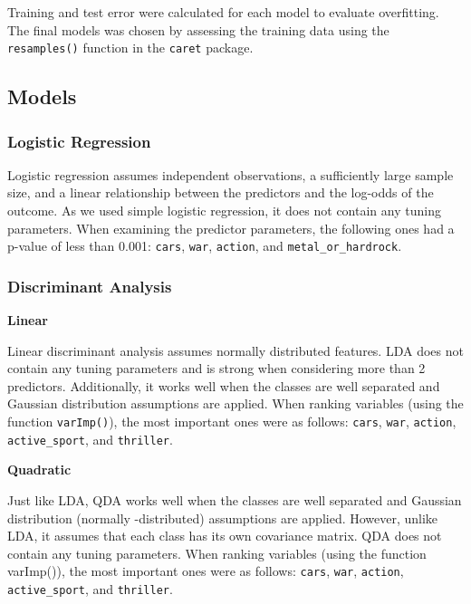 \documentclass[]{article}
\begin{document}
Training and test error were calculated for each model to evaluate
overfitting. The final models was chosen by assessing the training data
using the \texttt{resamples()} function in the \texttt{caret} package.

\subsection{Models}\label{models}

\subsubsection{Logistic Regression}\label{logistic-regression}

Logistic regression assumes independent observations, a sufficiently
large sample size, and a linear relationship between the predictors and
the log-odds of the outcome. As we used simple logistic regression, it
does not contain any tuning parameters. When examining the predictor
parameters, the following ones had a p-value of less than 0.001:
\texttt{cars}, \texttt{war}, \texttt{action}, and
\texttt{metal\_or\_hardrock}.

\subsubsection{Discriminant Analysis}\label{discriminant-analysis}

\textbf{Linear}

Linear discriminant analysis assumes normally distributed features. LDA
does not contain any tuning parameters and is strong when considering
more than 2 predictors. Additionally, it works well when the classes are
well separated and Gaussian distribution assumptions are applied. When
ranking variables (using the function \texttt{varImp()}), the most
important ones were as follows: \texttt{cars}, \texttt{war},
\texttt{action}, \texttt{active\_sport}, and \texttt{thriller}.

\textbf{Quadratic}

Just like LDA, QDA works well when the classes are well separated and
Gaussian distribution (normally -distributed) assumptions are applied.
However, unlike LDA, it assumes that each class has its own covariance
matrix. QDA does not contain any tuning parameters. When ranking
variables (using the function varImp()), the most important ones were as
follows: \texttt{cars}, \texttt{war}, \texttt{action},
\texttt{active\_sport}, and \texttt{thriller}.
\end{document}
